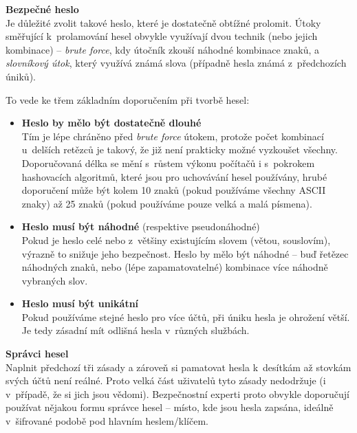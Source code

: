 
\textbf{Bezpečné heslo}\\
Je důležité zvolit takové heslo, které je dostatečně obtížné prolomit. Útoky směřující k~prolamování hesel obvykle využívají dvou technik (nebo jejich kombinace) -- \textit{brute force}, kdy útočník zkouší náhodné kombinace znaků, a \textit{slovníkový útok}, který využívá známá slova (případně hesla známá z~předchozích úniků).

To vede ke třem základním doporučením při tvorbě hesel:

\begin{itemize}
	\item \textbf{Heslo by mělo být dostatečně dlouhé}\\
	Tím je lépe chráněno před \textit{brute force} útokem, protože počet kombinací u~delších retězců je takový, že již není prakticky možné vyzkoušet všechny. Doporučovaná délka se mění s~růstem výkonu počítačů i s~pokrokem hashovacích algoritmů, které jsou pro uchovávání hesel používány, hrubé doporučení může být kolem 10 znaků (pokud používáme všechny ASCII znaky) až 25 znaků (pokud používáme pouze velká a malá písmena).

	\item \textbf{Heslo musí být náhodné} (respektive pseudonáhodné)\\
	Pokud je heslo celé nebo z~většiny existujícím slovem (větou, souslovím), výrazně to snižuje jeho bezpečnost. Heslo by mělo být náhodné -- buď řetězec náhodných znaků, nebo (lépe zapamatovatelné) kombinace více náhodně vybraných slov.

	\item \textbf{Heslo musí být unikátní}\\
	Pokud používáme stejné heslo pro více účtů, při úniku hesla je ohrožení větší. Je tedy zásadní mít odlišná hesla v~různých službách. 

\end{itemize}

\textbf{Správci hesel}\\
Naplnit předchozí tři zásady a zároveň si pamatovat hesla k~desítkám až stovkám svých účtů není reálné. Proto velká část uživatelů tyto zásady nedodržuje (i v~případě, že si jich jsou vědomi). Bezpečnostní experti proto obvykle doporučují používat nějakou formu správce hesel -- místo, kde jsou hesla zapsána, ideálně v~šifrované podobě pod hlavním heslem/klíčem.

